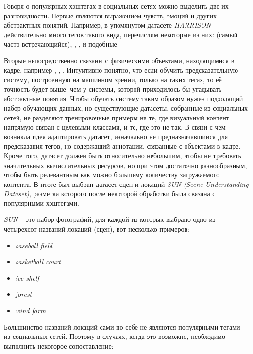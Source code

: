 \indent
\indent
Говоря о популярных хэштегах в социальных сетях можно выделить две 
их разновидности.
Первые являются выражением чувств, эмоций и других абстрактных понятий.
Например, в упомянутом датасете \textit{HARRISON} 
действительно много тегов такого вида, перечислим некоторые из них: 
 (самый часто встречающийся), , ,
 и подобные.

\indent
\indent
Вторые непосредственно
связаны с физическими объектами, находящимися в кадре, например  
, , . 
Интуитивно понятно, что если обучить предсказательную систему,
построенную на машинном зрении, только на таких тегах, то
её точность будет выше, чем у системы, которой приходилось бы угадывать
абстрактные понятия. Чтобы обучать систему таким образом
нужен подходящий набор обучающих данных, но существующие датасеты, 
собранные из социальных сетей, не разделяют тренировочные примеры на те, 
где визуальный контент напрямую связан с целевыми классами, и те, где это не так.
В связи с чем возникла идея 
адаптировать датасет, изначально не предназначавшийся для предсказания
тегов, но содержащий аннотации, связанные с объектами
в кадре. Кроме того, датасет должен быть относительно небольшим,
чтобы не требовать значительных 
вычислительных ресурсов, но при этом достаточно разнообразным, чтобы 
быть релевантным как можно большему количеству загружаемого контента.
В итоге был выбран датасет сцен и локаций 
\textit{SUN\cite{sundata} (Scene Understanding Dataset)}, 
разметка которого после некоторой обработки была
связана с популярными хэштегами.

\indent
\indent  
\textit{SUN} -- это набор фотографий, для каждой из которых выбрано одно
 из четырехсот названий локаций (сцен), вот несколько примеров:
  
  
\begin{itemize}
    \item \textit{baseball field}
    \item \textit{basketball court}
    \item \textit{ice shelf}
    \item \textit{forest}
    \item \textit{wind farm}
\end{itemize}


\indent
\indent
Большинство названий локаций сами по себе не являются популярными 
тегами из социальных сетей. Поэтому в случаях, когда это возможно, необходимо
выполнить некоторое сопоставление:


